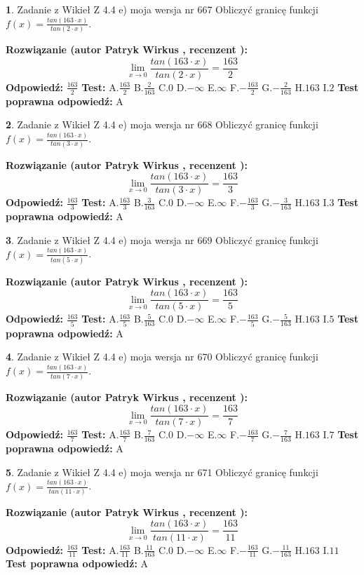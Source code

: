 \documentclass[12pt, a4paper]{article}
\theoremstyle{definition} %
\newtheorem{zad}{}
\newcommand{\zadStart}[1]{\begin{zad}#1\newline}
\newcommand{\zadStop}{\end{zad}}
\newcommand{\rozwStart}[2]{\noindent \textbf{Rozwiązanie (autor #1 , recenzent #2): }\newline}
\newcommand{\rozwStop}{\newline}
\newcommand{\odpStart}{\noindent \textbf{Odpowiedź:}\newline}
\newcommand{\odpStop}{\newline}
\newcommand{\testStart}{\noindent \textbf{Test:}\newline}
\newcommand{\testStop}{\newline}
\newcommand{\kluczStart}{\noindent \textbf{Test poprawna odpowiedź:}\newline}
\newcommand{\kluczStop}{\newline}
\begin{document}
\zadStart{Zadanie z Wikieł Z 4.4 e) moja wersja nr 667}
Obliczyć granicę funkcji $f(x)=\frac{tan(163\cdot x)}{tan(2\cdot x)}$.
\zadStop
\rozwStart{Patryk Wirkus}{}
$$\lim\limits_{x\to 0}\frac{tan(163\cdot x)}{tan(2\cdot x)}=
\frac{163}{2}$$
\rozwStop
\odpStart
$\frac{163}{2}$
\odpStop
\testStart
A.$\frac{163}{2}$
B.$\frac{2}{163}$
C.$0$
D.$-\infty$
E.$\infty$
F.$-\frac{163}{2}$
G.$-\frac{2}{163}$
H.$163$
I.$2$
\testStop
\kluczStart
A
\kluczStop



\zadStart{Zadanie z Wikieł Z 4.4 e) moja wersja nr 668}
Obliczyć granicę funkcji $f(x)=\frac{tan(163\cdot x)}{tan(3\cdot x)}$.
\zadStop
\rozwStart{Patryk Wirkus}{}
$$\lim\limits_{x\to 0}\frac{tan(163\cdot x)}{tan(3\cdot x)}=
\frac{163}{3}$$
\rozwStop
\odpStart
$\frac{163}{3}$
\odpStop
\testStart
A.$\frac{163}{3}$
B.$\frac{3}{163}$
C.$0$
D.$-\infty$
E.$\infty$
F.$-\frac{163}{3}$
G.$-\frac{3}{163}$
H.$163$
I.$3$
\testStop
\kluczStart
A
\kluczStop



\zadStart{Zadanie z Wikieł Z 4.4 e) moja wersja nr 669}
Obliczyć granicę funkcji $f(x)=\frac{tan(163\cdot x)}{tan(5\cdot x)}$.
\zadStop
\rozwStart{Patryk Wirkus}{}
$$\lim\limits_{x\to 0}\frac{tan(163\cdot x)}{tan(5\cdot x)}=
\frac{163}{5}$$
\rozwStop
\odpStart
$\frac{163}{5}$
\odpStop
\testStart
A.$\frac{163}{5}$
B.$\frac{5}{163}$
C.$0$
D.$-\infty$
E.$\infty$
F.$-\frac{163}{5}$
G.$-\frac{5}{163}$
H.$163$
I.$5$
\testStop
\kluczStart
A
\kluczStop



\zadStart{Zadanie z Wikieł Z 4.4 e) moja wersja nr 670}
Obliczyć granicę funkcji $f(x)=\frac{tan(163\cdot x)}{tan(7\cdot x)}$.
\zadStop
\rozwStart{Patryk Wirkus}{}
$$\lim\limits_{x\to 0}\frac{tan(163\cdot x)}{tan(7\cdot x)}=
\frac{163}{7}$$
\rozwStop
\odpStart
$\frac{163}{7}$
\odpStop
\testStart
A.$\frac{163}{7}$
B.$\frac{7}{163}$
C.$0$
D.$-\infty$
E.$\infty$
F.$-\frac{163}{7}$
G.$-\frac{7}{163}$
H.$163$
I.$7$
\testStop
\kluczStart
A
\kluczStop



\zadStart{Zadanie z Wikieł Z 4.4 e) moja wersja nr 671}
Obliczyć granicę funkcji $f(x)=\frac{tan(163\cdot x)}{tan(11\cdot x)}$.
\zadStop
\rozwStart{Patryk Wirkus}{}
$$\lim\limits_{x\to 0}\frac{tan(163\cdot x)}{tan(11\cdot x)}=
\frac{163}{11}$$
\rozwStop
\odpStart
$\frac{163}{11}$
\odpStop
\testStart
A.$\frac{163}{11}$
B.$\frac{11}{163}$
C.$0$
D.$-\infty$
E.$\infty$
F.$-\frac{163}{11}$
G.$-\frac{11}{163}$
H.$163$
I.$11$
\testStop
\kluczStart
A
\kluczStop
\end{document}
